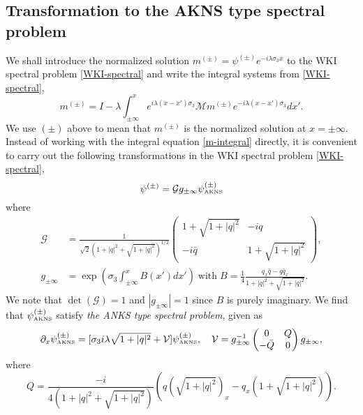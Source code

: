 \documentclass[11pt]{article}
\begin{document}
\subsection{Transformation to the AKNS type spectral problem}
We shall introduce the normalized solution $m^{(\pm)}=\psi^{(\pm)}e^{-i\lambda \sigma_3x}$ to the WKI spectral problem \eqref{WKI-spectral} and write the integral systems from \eqref{WKI-spectral}, 
\begin{equation}\label{m-integral}
m^{(\pm)}=I-\lambda\int_{\pm\infty}^x e^{i\lambda(x-x')\sigma_3}\mathcal{M}m^{(\pm)}e^{-i\lambda(x-x')\sigma_3}dx'.
\end{equation}
We use $(\pm)$ above to mean that $m^{(\pm)}$ is the normalized solution at $x=\pm \infty$. Instead of working with the integral equation \eqref{m-integral} directly, it is convenient to carry out the following transformations in the WKI spectral problem \eqref{WKI-spectral},
\begin{equation}\label{psi-varphi}
\psi^{(\pm)}=\mathcal{G}g_{\pm \infty} \psi_{\mbox{\tiny AKNS}}^{(\pm)}
\end{equation}
where
\begin{align*}
\mathcal{G} &=\frac{1}{\sqrt{2}(1+|q|^2+\sqrt{1+|q|^2})^{1/2}}\begin{pmatrix}  1+\sqrt{1+|q|^2} & -iq \\ -i\bar{q} & 1+\sqrt{1+|q|^2} \end{pmatrix}, \\
g_{\pm\infty}&=\exp\left( \sigma_3 \int_{\pm \infty}^xB(x')dx'\right)\; \mbox{with}\; B= \frac{1}{4}\frac{q_x\bar{q}-q\bar{q}_x}{1+|q|^2+\sqrt{1+|q|^2}}.
\end{align*}
We note that $\det(\mathcal{G})=1$ and $|g_{\pm\infty}|=1$ since $B$ is purely imaginary.
We find that $\psi_{\mbox{\tiny AKNS}}^{(\pm)}$ satisfy \emph{the ANKS type spectral problem}, given as 
\begin{equation}\label{AKNS}
\partial_x \psi_{\mbox{\tiny AKNS}}^{(\pm)}=[\sigma_3 i\lambda\sqrt{1+|q|^2} + \mathcal{V}] \psi_{\mbox{\tiny AKNS}}^{(\pm)}, \quad \mathcal{V}= g_{\pm\infty}^{-1}\begin{pmatrix}0 & Q \\ -\bar{Q} & 0 \end{pmatrix}g_{\pm\infty},
\end{equation}
where 
$$Q= \frac{-i}{4(1+|q|^2+\sqrt{1+|q|^2})}(q(\sqrt{1+|q|^2})_x -q_x(1+\sqrt{1+|q|^2})).$$
\end{document}
